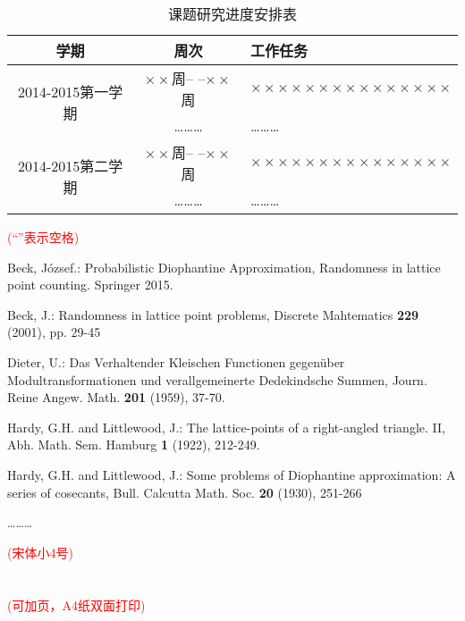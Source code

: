 \documentclass[11pt,a4paper]{article}
\newcommand{\xiaosihao}{\fontsize{12pt}{24pt}\selectfont}
\newcommand{\wuhao}{\fontsize{10.5pt}{18pt}\selectfont}
\newcommand\seccontent{
	\xiaosihao %
    \setlength{\parindent}{2em} %
    \setlength{\parskip}{0pt}
   }
\theoremstyle{definition}
\numberwithin{equation}{section}
\begin{document}
\begin{table}[htpb]
	\seccontent
	\centering
	\caption{课题研究进度安排表}

	\begin{tabular}{ccp{18em}<{\centering}}
		\hline
		学期                                       & 周次                                     & 工作任务                                                                                      \\\hline
		\multirow{2}{5em}{2014-2015第一学期}       & $ \times\times $周-- --$\times\times $周 & $\times\times\times\times\times\times\times\times\times\times\times\times\times\times\times $ \\
		\cline{2-3}
		                                           & \ldots\ldots\ldots                       & \ldots\ldots\ldots                                                                            \\
		\hline\multirow{2}{5em}{2014-2015第二学期} & $ \times\times $周-- --$\times\times $周 & $\times\times\times\times\times\times\times\times\times\times\times\times\times\times\times $ \\
		\cline{2-3}
		                                           & \ldots\ldots\ldots                       & \ldots\ldots\ldots                                                                            \\
		\hline
	\end{tabular}
\end{table}
{\wuhao\textcolor{red}{(``\fbox{\phantom{x}}''表示空格)}}











{}

\begin{thebibliography}{2}
	\seccontent
	Beck, J\'ozsef.: Probabilistic Diophantine Approximation, Randomness in lattice point counting. Springer 2015.

	Beck, J.: Randomness in lattice point problems, Discrete Mahtematics \textbf{229} (2001), pp. 29-45

	Dieter, U.: Das Verhaltender Kleischen Functionen gegen\"uber Modultransformationen und verallgemeinerte Dedekindsche Summen, Journ. Reine Angew. Math. \textbf{201} (1959), 37-70.

	Hardy, G.H. and Littlewood, J.: The lattice-points of a right-angled triangle. II, Abh. Math. Sem. Hamburg \textbf{1} (1922), 212-249.

	Hardy, G.H. and Littlewood, J.: Some problems of Diophantine approximation: A series of cosecants, Bull. Calcutta Math. Soc. \textbf{20} (1930), 251-266

\end{thebibliography}
%	

\hspace{15em} \ldots\ldots\ldots

{\wuhao\textcolor{red}{(宋体小4号)}}
\\
\\
\\
{\wuhao\textcolor{red}{(可加页，A4纸双面打印)}}
\end{document}
